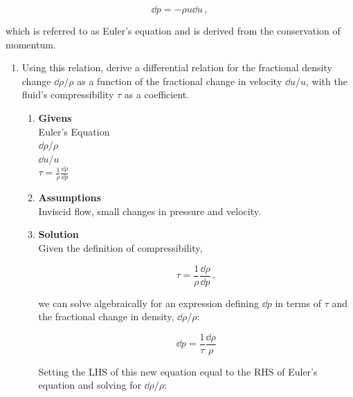 \documentclass[12pt,letterpaper]{article}
\begin{document}
	\begin{equation*}
		\dd p = - \rho u\dd u\,,
	\end{equation*}
	
	which is referred to as Euler’s equation and is derived from the conservation of momentum.
	
	\begin{enumerate}[label=(\alph*)]
		\label{Sec:Problem1}
		\item Using this relation, derive a differential relation for the fractional density change $\dd \rho / \rho$ as a function of the fractional change in velocity $\dd u/ u$, with the fluid's compressibility $\tau$ as a coefficient.
		
		\medskip
		
		\begin{enumerate}[label=\arabic*.]
			
			\item{\textbf{Givens}} \\
				Euler's Equation\\
				$\dd \rho / \rho $ \\
				$\dd u / u$ \\
				$\tau = \frac{1}{\rho} \frac{\dd \rho}{\dd p}$

			\item{\textbf{Assumptions}} \\
			Inviscid flow, small changes in pressure and velocity.\\
			
			
			\item{\textbf{Solution}} \\
				Given the definition of compressibility,
			
			
			\begin{equation*}
				\tau = \frac{1}{\rho} \frac{\dd \rho}{\dd p} \,,
			\end{equation*}
			
			we can solve algebraically for an expression defining $\dd p$ in terms of $\tau$ and the fractional change in density, $\dd \rho / \rho$:
			
			\begin{equation*}
				\dd p = \frac{1}{\tau} \frac{\dd \rho}{\rho}
			\end{equation*}
		
			Setting the LHS of this new equation equal to the RHS of Euler's equation and solving for $\dd \rho / \rho$:
			

\end{enumerate}
\end{enumerate}
\end{document}
